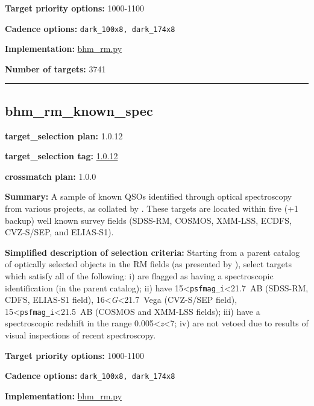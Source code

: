 \noindent\textbf{Target priority options:} 1000-1100

\noindent\textbf{Cadence options:} \texttt{dark\_100x8,\ dark\_174x8}

\noindent\textbf{Implementation:}
\href{https://github.com/sdss/target_selection/blob/1.0.12/python/target_selection/cartons/bhm_rm.py}{bhm\_rm.py}

\noindent\textbf{Number of targets:} 3741

\begin{center}\rule{0.5\linewidth}{0.5pt}\end{center}

\hypertarget{bhm_rm_known_spec_plan1.0.12}{%
\subsection{bhm\_rm\_known\_spec}\label{bhm_rm_known_spec_plan1.0.12}}

\noindent\textbf{target\_selection plan:} 1.0.12

\noindent\textbf{target\_selection tag:}
\href{https://github.com/sdss/target_selection/tree/1.0.12/}{1.0.12}

\noindent\textbf{crossmatch plan:} 1.0.0

\noindent\textbf{Summary:} A sample of known QSOs identified through optical
spectroscopy from various projects, as collated by
\citet{Yang2022}. These targets are located within five (+1 backup) well
known survey fields (SDSS-RM, COSMOS, XMM-LSS, ECDFS, CVZ-S/SEP, and
ELIAS-S1).

\noindent\textbf{Simplified description of selection criteria:} Starting from a
parent catalog of optically selected objects in the RM fields (as
presented by
\citealt{Yang2022}), select targets which satisfy all of the following: i)
are flagged as having a spectroscopic identification (in the parent
catalog); ii) have 15\textless{}\texttt{psfmag\_i}\textless21.7~AB
(SDSS-RM, CDFS, ELIAS-S1 field), 16\textless{}\emph{G}\textless21.7~Vega
(CVZ-S/SEP field), 15\textless{}\texttt{psfmag\_i}\textless21.5~AB
(COSMOS and XMM-LSS fields); iii) have a spectroscopic redshift in the
range 0.005\textless{}\emph{z}\textless7; iv) are not vetoed due to
results of visual inspections of recent spectroscopy.


\noindent\textbf{Target priority options:} 1000-1100

\noindent\textbf{Cadence options:} \texttt{dark\_100x8,\ dark\_174x8}

\noindent\textbf{Implementation:}
\href{https://github.com/sdss/target_selection/blob/1.0.12/python/target_selection/cartons/bhm_rm.py}{bhm\_rm.py}

